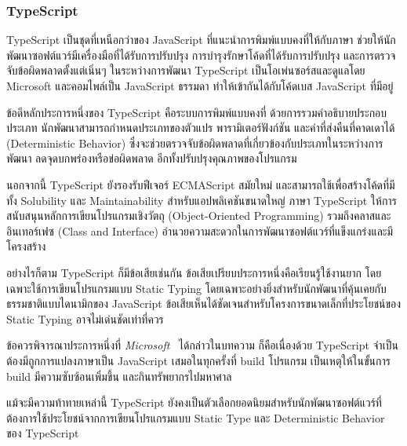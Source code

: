 \documentclass[12pt,oneside,openright,a4paper]{cpe-thai-project}
\begin{document}
        \subsubsection{TypeScript}
            \begin{flushleft}
                TypeScript เป็นชุดที่เหนือกว่าของ JavaScript ที่แนะนำการพิมพ์แบบคงที่ให้กับภาษา ช่วยให้นักพัฒนาซอฟต์แวร์มีเครื่องมือที่ได้รับการปรับปรุง การบำรุงรักษาโค้ดที่ได้รับการปรับปรุง และการตรวจจับข้อผิดพลาดตั้งแต่เนิ่นๆ ในระหว่างการพัฒนา TypeScript เป็นโอเพ่นซอร์สและดูแลโดย Microsoft และคอมไพล์เป็น JavaScript ธรรมดา ทำให้เข้ากันได้กับโค้ดเบส JavaScript ที่มีอยู่~\cite{hejlsbergts, microsoftts}
            \end{flushleft}
            \begin{flushleft}
                ข้อดีหลักประการหนึ่งของ TypeScript คือระบบการพิมพ์แบบคงที่ ด้วยการรวมคำอธิบายประกอบประเภท นักพัฒนาสามารถกำหนดประเภทของตัวแปร พารามิเตอร์ฟังก์ชัน และค่าที่ส่งคืนที่คาดเดาได้ (Deterministic Behavior) ซึ่งจะช่วยตรวจจับข้อผิดพลาดที่เกี่ยวข้องกับประเภทในระหว่างการพัฒนา ลดจุดบกพร่องหรือข่อผิดพลาด อีกทั้งปรับปรุงคุณภาพของโปรแกรม~\cite{cherny19ts, microsoftts}
            \end{flushleft}
            \begin{flushleft}  
                นอกจากนี้ TypeScript ยังรองรับฟีเจอร์ ECMAScript สมัยใหม่ และสามารถใช้เพื่อสร้างโค้ดที่มีทั้ง Solubility และ Maintainability สำหรับแอปพลิเคชันขนาดใหญ่ ภาษา TypeScript ให้การสนับสนุนหลักการเขียนโปรแกรมเชิงวัตถุ (Object-Oriented Programming) รวมถึงคลาสและอินเทอร์เฟซ (Class and Interface) อำนวยความสะดวกในการพัฒนาซอฟต์แวร์ที่แข็งแกร่งและมีโครงสร้าง~\cite{hejlsbergts}
            \end{flushleft}
            \begin{flushleft}
                อย่างไรก็ตาม TypeScript ก็มีข้อเสียเช่นกัน ข้อเสียเปรียบประการหนึ่งคือเรียนรู้ใช้งานยาก โดยเฉพาะใช้การเขียนโปรแกรมแบบ Static Typing โดยเฉพาะอย่างยิ่งสำหรับนักพัฒนาที่คุ้นเคยกับธรรมชาติแบบไดนามิกของ JavaScript ข้อเสียเห็นได้ชัดเจนสำหรับโครงการขนาดเล็กที่ประโยชน์ของ Static Typing อาจไม่เด่นชัดเท่าที่ควร~\cite{cherny19ts}
            \end{flushleft}
            \begin{flushleft}
                ข้อควรพิจารณาประการหนึ่งที่ \textit{Microsoft}~\cite{microsoftts} ได้กล่าวในบทความ ก็คือเนื่องด้วย TypeScript จำเป็นต้องมีถูกการแปลงภาษาเป็น JavaScript เสมอในทุกครั้งที่ build โปรแกรม เป็นเหตุให้ในขั้นการ build มีความซับซ้อนเพิ่มขึ้น และกินทรัพยากรไปมหาศาล
            \end{flushleft}
            \begin{flushleft}
                แม้จะมีความท้าทายเหล่านี้ TypeScript ยังคงเป็นตัวเลือกยอดนิยมสำหรับนักพัฒนาซอฟต์แวร์ที่ต้องการใช้ประโยชน์จากการเขียนโปรแกรมแบบ Static Type และ Deterministic Behavior ของ TypeScript
            \end{flushleft}
\end{document}
